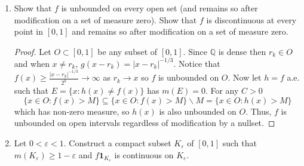 \documentclass[12pt]{article}
\begin{document}
\begin{enumerate}
\begin{enumerate}[label=(\roman*)]
		            \begin{proof}
			            Let $f_N(x) = \mathbf{1}_{[0,1]}\sum_{k=1}^N 2^{-k} g(x - r_k)dx$ be the Nth partial sum. It follows that
			            \begin{align}
				            \int_0^1 f(x)dx & = \sum_{k=1}^N 2^{-k} \int_0^1 g(x)dx                                         \\
				                            & = \sum_{k=1}^N \int_{-r_k}^0 (r_k-x)^{-1/3}dx + \int_0^{r_k} (x-r_k)^{-1/3}dx \\
				                            & = \frac{3}{2}r_k^{2/3} + \frac{3}{2}(1-r_k)^{2/3} \leq 3.
			            \end{align}
			            Since $f_N(x) \to f(x)$ and $\int_0^1 f(x)dx$ is bounded then by MCT $\int_0^1 f(x)dx = \lim_{N\to \infty}\int_0^1 f_N(x)dx \leq 3$ so $f$ is $\mathcal{L}^1([0,1])$ and thus $L^1([0,1])$ also.
		            \end{proof}

		      \item Show that $f$ is unbounded on every open set (and remains so after modification on a set of measure zero). Show that $f$ is discontinuous at every point in $[0,1]$ and remains so after modification on a set of measure zero.

		            \begin{proof}
			            Let $O\subset [0,1]$ be any subset of $[0,1]$. Since $\mathbb{Q}$ is dense then $r_k \in O$ and when
			            $x\neq r_k$, $g(x-r_k) = |x-r_k|^{-1/3}$. Notice that $f(x) \geq \frac{|x-r_k|^{-1/3}}{2^k} \to \infty$ as $r_k \to x$ so $f$ is unbounded on $O$. Now let $h=f$ a.e. such that
			            $E = \{x: h(x) \neq f(x)\}$ has $m(E) = 0$. For any $C>0$
			            $$\{x\in O: f(x) >M\} \subseteq \{x\in O:f(x)>M\}\backslash M = \{x\in O: h(x) >M\}$$
			            which has non-zero measure, so $h(x)$ is also unbounded on $O$. Thus, $f$ is unbounded on open intervals regardless of modification by a nullset.

		            \end{proof}

		      \item Let $0 < \varepsilon < 1$. Construct a compact subset $K_\varepsilon$ of $[0,1]$ such that $m(K_\varepsilon) \geq 1 - \varepsilon$ and $f\mathbf{1}_{K_\varepsilon}$ is continuous on $K_\varepsilon$.


\end{enumerate}
\end{enumerate}
\end{document}
